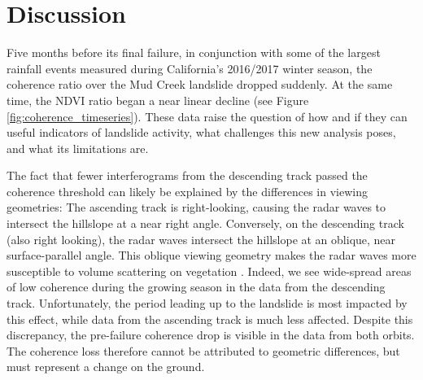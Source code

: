 \documentclass[nhess, manuscript]{copernicus}
\begin{document}
\section{Discussion}
\label{sec:discussion}
Five months before its final failure, in conjunction with some of the largest rainfall events measured during California's 2016/2017 winter season, the coherence ratio over the Mud Creek landslide dropped suddenly. At the same time, the NDVI ratio began a near linear decline (see Figure \ref{fig:coherence_timeseries}). These data raise the question of how and if they can useful indicators of landslide activity, what challenges this new analysis poses, and what its limitations are. \par

The fact that fewer interferograms from the descending track passed the coherence threshold can likely be explained by the differences in viewing geometries: The ascending track is right-looking, causing the radar waves to intersect the hillslope at a near right angle. Conversely, on the descending track (also right looking), the radar waves intersect the hillslope at an oblique, near surface-parallel angle. This oblique viewing geometry makes the radar waves more susceptible to volume scattering on vegetation \citep{massonnet1998}. Indeed, we see wide-spread areas of low coherence during the growing season in the data from the descending track. Unfortunately, the period leading up to the landslide is most impacted by this effect, while data from the ascending track is much less affected. Despite this discrepancy, the pre-failure coherence drop is visible in the data from both orbits. The coherence loss therefore cannot be attributed to geometric differences, but must represent a change on the ground.\par
\end{document}

